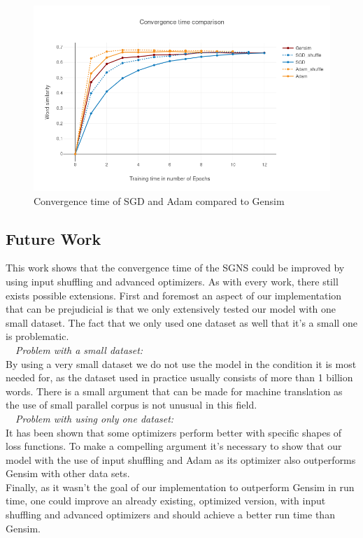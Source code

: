 \begin{figure}[h]
\centering
\includegraphics[scale=0.3]{images/gensim_vs_adam}
\caption{Convergence time of SGD and Adam compared to Gensim}
\label{fig:gensim_vs_adam}
\end{figure}

\subsection{Future Work}
This work shows that the convergence time of the SGNS could be improved by using input shuffling and advanced optimizers. As with every work, there still exists possible extensions. First and foremost an aspect of our implementation that can be prejudicial is that we only extensively tested our model with one small dataset. The fact that we only used one dataset as well that it's a small one is problematic. \\ 
~~\textit{Problem with a small dataset:} \\ By using a very small dataset we do not use the model in the condition it is most needed for, as the dataset used in practice usually consists of more than 1 billion words. There is a small argument that can be made for machine translation as the use of small parallel corpus is not unusual in this field. \\
~~\textit{Problem with using only one dataset:}\\
It has been shown that some optimizers perform better with specific shapes of loss functions. To make a compelling argument it's necessary to show that our model with the use of input shuffling and Adam as its optimizer also outperforms Gensim with other data sets.\\
Finally, as it wasn't the goal of our implementation to outperform Gensim in run time, one could improve an already existing, optimized version, with input shuffling and advanced optimizers and should achieve a better run time than Gensim.